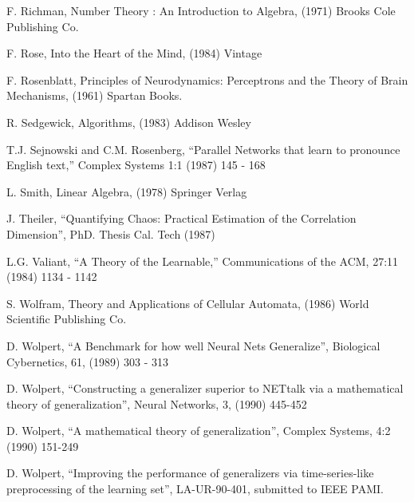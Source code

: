 F. Richman, Number Theory : An Introduction to Algebra, (1971) Brooks
Cole Publishing Co.

F. Rose, Into the Heart of the Mind, (1984) Vintage

F. Rosenblatt, Principles of Neurodynamics: Perceptrons and the Theory
of Brain Mechanisms, (1961) Spartan Books.

R. Sedgewick, Algorithms, (1983) Addison Wesley

T.J. Sejnowski and C.M. Rosenberg, ``Parallel Networks that learn to
pronounce English text,'' Complex Systems 1:1 (1987) 145 - 168

L. Smith, Linear Algebra, (1978) Springer Verlag

J. Theiler, ``Quantifying Chaos: Practical Estimation of the Correlation
Dimension'', PhD. Thesis Cal. Tech (1987)

L.G. Valiant, ``A Theory of the Learnable,'' Communications of the
ACM, 27:11 (1984) 1134 - 1142

S. Wolfram, Theory and Applications of Cellular Automata, (1986) World
Scientific Publishing Co.

D. Wolpert, ``A Benchmark for how well Neural Nets Generalize'',
Biological Cybernetics, 61, (1989) 303 - 313

D. Wolpert, ``Constructing a generalizer superior to NETtalk via a
mathematical theory of generalization'', Neural Networks, 3, (1990)
445-452

D. Wolpert, ``A mathematical theory of generalization'', Complex
Systems, 4:2 (1990) 151-249

D. Wolpert, ``Improving the performance of generalizers via
time-series-like preprocessing of the learning set'', LA-UR-90-401,
submitted to IEEE PAMI.


